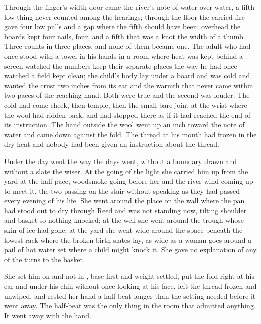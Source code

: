 Through the finger's-width door came the river's note of water over water, a fifth low thing never counted among the hearings; through the floor the carried fire gave four low pulls and a gap where the fifth should have been; overhead the boards kept four nails, four, and a fifth that was a knot the width of a thumb. Three counts in three places, and none of them became one. The adult who had once stood with a towel in his hands in a room where heat was kept behind a screen watched the numbers keep their separate places the way he had once watched a field kept clean; the child's body lay under a board and was cold and wanted the crust two inches from its ear and the warmth that never came within two paces of the reaching hand. Both were true and the second was louder. The cold had come cheek, then temple, then the small bare joint at the wrist where the wool had ridden back, and had stopped there as if it had reached the end of its instruction. The hand outside the wool went up an inch toward the note of water and came down against the fold. The thread at his mouth had frozen in the dry heat and nobody had been given an instruction about the thread.

\scenebreak

Under  the day went the way the days went, without a boundary drawn and without a slate the wiser. At the going of the light she carried him up from the yard at the half-pace, woodsmoke going before her and the river wind coming up to meet it, the two passing on the stair without speaking as they had passed every evening of his life. She went around the place on the wall where the pan had stood out to dry through Reed and was not standing now, tilting shoulder and basket so nothing knocked; at the well she went around the trough whose skin of ice had gone; at the yard she went wide around the space beneath the lowest rack where the broken birth-slates lay, as wide as a woman goes around a pail of hot water set where a child might knock it. She gave no explanation of any of the turns to the basket.

She set him on  and not in , base first and weight settled, put the fold right at his ear and under his chin without once looking at his face, left the thread frozen and unwiped, and rested her hand a half-beat longer than the setting needed before it went away. The half-beat was the only thing in the room that admitted anything. It went away with the hand.

